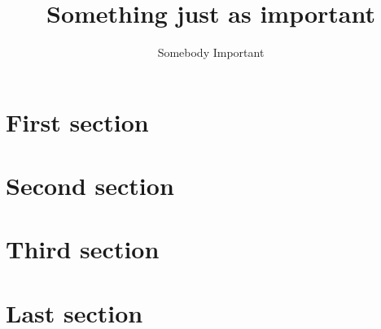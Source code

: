 \documentclass{article}
\begin{document}
\begin{titlepage}
\thispagestyle{empty}
\author{Somebody Important}
\title{Something just as important}
\maketitle
\lipsum[1-2]
\end{titlepage}


\section{First section} \lipsum[1-4]
\section{Second section} \lipsum[5-8]
\section{Third section} \lipsum[9-12]
\section{Last section} \lipsum[13-16]
\end{document}
